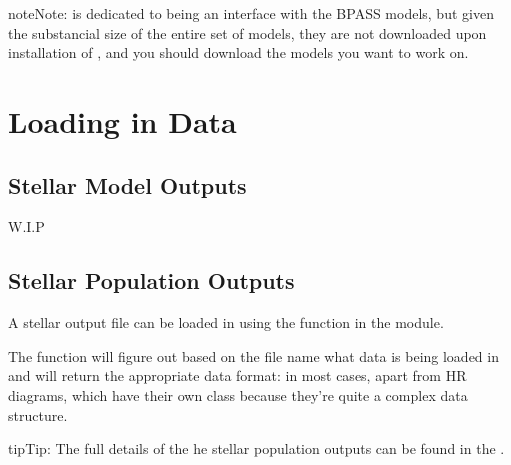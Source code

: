 \documentclass[letterpaper,10pt,english]{sphinxmanual}
\begin{document}
\begin{sphinxadmonition}{note}{Note:}
 is dedicated to being an interface with the BPASS models, but given the substancial size of the entire set of models, they are not downloaded upon installation of , and you should download the models you want to work on.
\end{sphinxadmonition}


\section{Loading in Data}
\label{\detokenize{quick_start:loading-in-data}}

\subsection{Stellar Model Outputs}
\label{\detokenize{quick_start:stellar-model-outputs}}
W.I.P


\subsection{Stellar Population Outputs}
\label{\detokenize{quick_start:stellar-population-outputs}}
A stellar output file can be loaded in using the  function in the  module.

%
\begin{sphinxVerbatim}[commandchars=\\\{\},numbers=left,firstnumber=1,stepnumber=1]
   

  
\end{sphinxVerbatim}

The function will figure out based on the file name what data is being loaded in and will return the appropriate data format:  in most cases, apart from HR diagrams, which have their own  class \textendash{} because they’re quite a complex data structure.

\begin{sphinxadmonition}{tip}{Tip:}
The full details of the he stellar population outputs can be found in the .
\end{sphinxadmonition}
\end{document}
